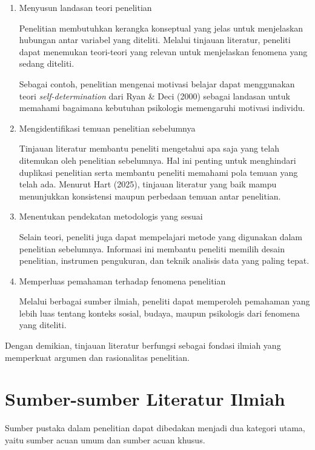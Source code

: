\documentclass[
  indonesian,
  letterpaper,
  DIV=11,
  numbers=noendperiod]{scrreprt}
\begin{document}
\begin{enumerate}
\def\labelenumi{\arabic{enumi}.}
\item
  Menyusun landasan teori penelitian

  Penelitian membutuhkan kerangka konseptual yang jelas untuk
  menjelaskan hubungan antar variabel yang diteliti. Melalui tinjauan
  literatur, peneliti dapat menemukan teori-teori yang relevan untuk
  menjelaskan fenomena yang sedang diteliti.

  Sebagai contoh, penelitian mengenai motivasi belajar dapat menggunakan
  teori \emph{self-determination} dari Ryan \& Deci (2000) sebagai
  landasan untuk memahami bagaimana kebutuhan psikologis memengaruhi
  motivasi individu.
\item
  Mengidentifikasi temuan penelitian sebelumnya

  Tinjauan literatur membantu peneliti mengetahui apa saja yang telah
  ditemukan oleh penelitian sebelumnya. Hal ini penting untuk
  menghindari duplikasi penelitian serta membantu peneliti memahami pola
  temuan yang telah ada. Menurut Hart (2025), tinjauan literatur yang
  baik mampu menunjukkan konsistensi maupun perbedaan temuan antar
  penelitian.
\item
  Menentukan pendekatan metodologis yang sesuai

  Selain teori, peneliti juga dapat mempelajari metode yang digunakan
  dalam penelitian sebelumnya. Informasi ini membantu peneliti memilih
  desain penelitian, instrumen pengukuran, dan teknik analisis data yang
  paling tepat.
\item
  Memperluas pemahaman terhadap fenomena penelitian

  Melalui berbagai sumber ilmiah, peneliti dapat memperoleh pemahaman
  yang lebih luas tentang konteks sosial, budaya, maupun psikologis dari
  fenomena yang diteliti.
\end{enumerate}

Dengan demikian, tinjauan literatur berfungsi sebagai fondasi ilmiah
yang memperkuat argumen dan rasionalitas penelitian.

\section{Sumber-sumber Literatur
Ilmiah}\label{sumber-sumber-literatur-ilmiah}

Sumber pustaka dalam penelitian dapat dibedakan menjadi dua kategori
utama, yaitu sumber acuan umum dan sumber acuan khusus.
\end{document}
